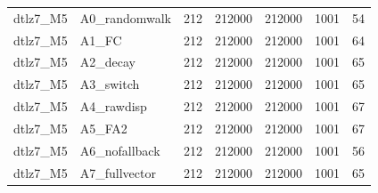 \begin{tabular}{llrrrrr}
dtlz7_M5 & A0_randomwalk & 212 & 212000 & 212000 & 1001 & 54 \\
dtlz7_M5 & A1_FC & 212 & 212000 & 212000 & 1001 & 64 \\
dtlz7_M5 & A2_decay & 212 & 212000 & 212000 & 1001 & 65 \\
dtlz7_M5 & A3_switch & 212 & 212000 & 212000 & 1001 & 65 \\
dtlz7_M5 & A4_rawdisp & 212 & 212000 & 212000 & 1001 & 67 \\
dtlz7_M5 & A5_FA2 & 212 & 212000 & 212000 & 1001 & 67 \\
dtlz7_M5 & A6_nofallback & 212 & 212000 & 212000 & 1001 & 56 \\
dtlz7_M5 & A7_fullvector & 212 & 212000 & 212000 & 1001 & 65 \\
\bottomrule
\end{tabular}
